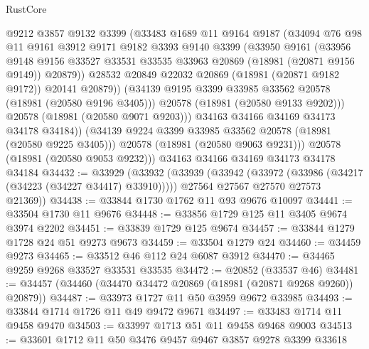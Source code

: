 \begin{lexlean}{RustCore}
\begin{coremodule}
                @9212
                @3857
                @9132
                @3399
                (@33483
                  @1689
                  @11
                  @9164
                  @9187
                  (@34094
                    @76
                    @98
                    @11
                    @9161
                    @3912
                    @9171
                    @9182
                    @3393
                    @9140
                    @3399
                    (@33950
                      @9161
                      (@33956
                        @9148
                        @9156
                        @33527
                        @33531
                        @33535
                        @33963
                        @20869
                        (@18981 (@20871 @9156 @9149))
                        @20879))
                    @28532
                    @20849
                    @22032
                    @20869
                    (@18981 (@20871 @9182 @9172))
                    @20141
                    @20879))
                (@34139 @9195 @3399 @33985 @33562 @20578 (@18981 (@20580 @9196 @3405)))
                @20578
                (@18981 (@20580 @9133 @9202)))
              @20578
              (@18981 (@20580 @9071 @9203)))
            @34163
            @34166
            @34169
            @34173
            @34178
            @34184))
        (@34139 @9224 @3399 @33985 @33562 @20578 (@18981 (@20580 @9225 @3405)))
        @20578
        (@18981 (@20580 @9063 @9231)))
      @20578
      (@18981 (@20580 @9053 @9232)))
    @34163
    @34166
    @34169
    @34173
    @34178
    @34184
@34432 := @33929
    (@33932
      (@33939
        (@33942 (@33972 (@33986 (@34217 (@34223 (@34227 @34417) @33910)))))
        @27564
        @27567
        @27570
        @27573
        @21369))
@34438 := @33844 @1730 @1762 @11 @93 @9676 @10097
@34441 := @33504 @1730 @11 @9676
@34448 := @33856 @1729 @125 @11 @3405 @9674 @3974 @2202
@34451 := @33839 @1729 @125 @9674
@34457 := @33844 @1279 @1728 @24 @51 @9273 @9673
@34459 := @33504 @1279 @24
@34460 := @34459 @9273
@34465 := @33512 @46 @112 @24 @6087 @3912
@34470 := @34465 @9259 @9268 @33527 @33531 @33535
@34472 := @20852 (@33537 @46)
@34481 := @34457 (@34460 (@34470 @34472 @20869 (@18981 (@20871 @9268 @9260)) @20879))
@34487 := @33973 @1727 @11 @50 @3959 @9672 @33985
@34493 := @33844 @1714 @1726 @11 @49 @9472 @9671
@34497 := @33483 @1714 @11 @9458 @9470
@34503 := @33997 @1713 @51 @11 @9458 @9468 @9003
@34513 := @33601 @1712 @11 @50 @3476 @9457 @9467 @3857 @9278 @3399 @33618

\end{coremodule}
\end{lexlean}
